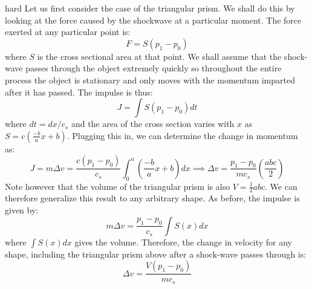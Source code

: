 \begin{solution}{hard}
Let us first consider the case of the triangular prism. We shall do this by looking at the force caused by the shockwave at a particular moment. The force exerted at any particular point is:
$$F=S(p_1-p_0)$$
where $S$ is the cross sectional area at that point. We shall assume that the shock-wave passes through the object extremely quickly so throughout the entire process the object is stationary and only moves with the momentum imparted after it has passed. The impulse is thus:
$$J=\int S(p_1-p_0) dt$$
where $dt=dx/c_s$ and the area of the cross section varies with $x$ as $S=c(\frac{-b}{a}x+b)$. Plugging this in, we can determine the change in momentum as:
$$J=m\Delta v=\frac{c(p_1-p_0)}{c_s} \int_0^a \left(\frac{-b}{a}x+b\right) dx \implies \Delta v = \frac{p_1-p_0}{mc_s}\left(\frac{abc}{2}\right)$$
Note however that the volume of the triangular prism is also $V=\frac{1}{2}abc$. We can therefore generalize this result to any arbitrary shape. As before, the impulse is given by:
$$m\Delta v=\frac{p_1-p_0}{c_s}\int S(x) dx$$
where $\displaystyle \int S(x) dx$ gives the volume. Therefore, the change in velocity for any shape, including the triangular prism above after a shock-wave passes through is:
$$\boxed{\Delta v = \frac{V(p_1-p_0)}{mc_s}}$$
\end{solution}
